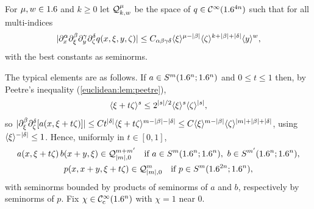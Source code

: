 \begin{definition}\label{semiclassical:def:Q}
  For $\mu,w\in1.6$ and $k\ge0$ let $\mathcal{Q}^{\mu}_{k,w}$ be the space of
  $q\in\mathcal{C}^\infty(1.6^{4n})$ such that for all multi-indices
  \begin{equation}\label{semiclassical:eq:Q-est}
    \lvert \partial^\alpha_x\partial^\beta_\xi\partial^\gamma_y\partial^\delta_\zeta q(x,\xi,y,\zeta)\rvert\le
    C_{\alpha\beta\gamma\delta}\langle \xi\rangle^{\mu-\lvert \beta\rvert}\langle \zeta\rangle^{k+\lvert \beta\rvert+\lvert \delta\rvert}\langle y\rangle^w,
  \end{equation}
  with the best constants as seminorms.
\end{definition}

The typical elements are as follows. If $a\in S^m(1.6^n;1.6^n)$ and
$0\le t\le1$ then, by Peetre's inequality (\cref{euclidean:lem:peetre}),
\begin{equation}\label{semiclassical:eq:peetre-shift}
  \langle \xi+t\zeta\rangle^{s}\le2^{\lvert s\rvert/2}\langle \xi\rangle^{s}\langle \zeta\rangle^{\lvert s\rvert},
\end{equation}
so $\lvert \partial^\beta_\xi\partial^\delta_\zeta[a(x,\xi+t\zeta)]\rvert\le
Ct^{\lvert \delta\rvert}\langle \xi+t\zeta\rangle^{m-\lvert \beta\rvert-\lvert \delta\rvert}\le
C\langle \xi\rangle^{m-\lvert \beta\rvert}\langle \zeta\rangle^{\lvert m\rvert+\lvert \beta\rvert+\lvert \delta\rvert}$, using
$\langle \xi\rangle^{-\lvert \delta\rvert}\le1$. Hence, uniformly in $t\in[0,1]$,
\begin{equation}\label{semiclassical:eq:Q-examples}
  \begin{gathered}
    a(x,\xi+t\zeta)\,b(x+y,\xi)\in\mathcal{Q}^{m+m'}_{\lvert m\rvert,0}\quad\text{if }a\in S^m(1.6^n;1.6^n),\ b\in S^{m'}(1.6^n;1.6^n),\\
    p(x,x+y,\xi+t\zeta)\in\mathcal{Q}^{m}_{\lvert m\rvert,0}\quad\text{if }p\in S^m(1.6^{2n};1.6^n),
  \end{gathered}
\end{equation}
with seminorms bounded by products of seminorms of $a$ and $b$, respectively
by seminorms of $p$. Fix $\chi\in\mathcal{C}^\infty_{\mathrm{c}}(1.6^n)$ with $\chi=1$ near $0$.


